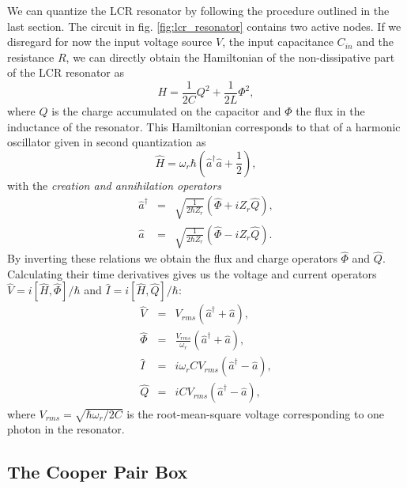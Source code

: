 We can quantize the LCR resonator by following the procedure outlined in the last section. The circuit in fig. \ref{fig:lcr_resonator} contains two active nodes. If we disregard for now the input voltage source $V$, the input capacitance $C_{in}$ and the resistance $R$, we can directly obtain the Hamiltonian of the non-dissipative part of the LCR resonator as
%
\begin{equation}
H = \frac{1}{2C}Q^2+\frac{1}{2L}\Phi^2,
\end{equation}
%
where $Q$ is the charge accumulated on the capacitor and $\Phi$ the flux in the inductance of the resonator. This Hamiltonian corresponds to that of a harmonic oscillator given in second quantization as
%
\begin{equation}
\hat{H} = \omega_r\hbar\left(\hat{a}^\dagger\hat{a}+\frac{1}{2}\right), \label{eq:lc_hamiltonian}
\end{equation}
%
with the {\it creation and annihilation operators}
%
\begin{eqnarray}
\hat{a}^\dagger & = & \sqrt{\frac{1}{2\hbar Z_r}}\left(\hat{\Phi}+iZ_r \hat{Q}\right),\\
\hat{a} & = & \sqrt{\frac{1}{2\hbar Z_r}}\left( \hat{\Phi}-iZ_r \hat{Q}\right).
\end{eqnarray}
%
By inverting these relations we obtain the flux and charge operators $\hat{\Phi}$ and $\hat{Q}$. Calculating their time derivatives gives us the voltage and current operators $\hat{V}=i[\hat{H},\hat{\Phi}]/\hbar$ and $\hat{I}=i[\hat{H},\hat{Q}]/\hbar$:
%
\begin{eqnarray}
\hat{V} & = & V_{rms}\left(\hat{a}^\dagger+\hat{a}\right), \\
\hat{\Phi} & = & \frac{V_{rms}}{\omega_r}\left(\hat{a}^\dagger+\hat{a}\right), \\
\hat{I} & = & i \omega_r C V_{rms}\left(\hat{a}^\dagger-\hat{a}\right), \\
\hat{Q} & = & i C V_{rms}\left(\hat{a}^\dagger-\hat{a}\right),
\end{eqnarray}
%
where $V_{rms} = \sqrt{\hbar\omega_r/2C}$ is the root-mean-square voltage corresponding to one photon in the resonator.

\subsection{The Cooper Pair Box}

